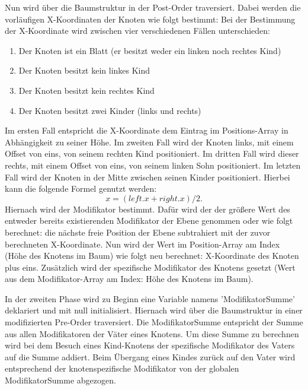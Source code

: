 Nun wird über die Baumstruktur in der Post-Order traversiert. Dabei werden die vorläufigen X-Koordinaten der Knoten wie folgt bestimmt:
Bei der Bestimmung der X-Koordinate wird zwischen vier verschiedenen Fällen unterschieden:
\begin{enumerate}
	\item Der Knoten ist ein Blatt (er besitzt weder ein linken noch rechtes Kind)
	\item Der Knoten besitzt kein linkes Kind
	\item Der Knoten besitzt kein rechtes Kind
	\item Der Knoten besitzt zwei Kinder (links und rechts)
\end{enumerate}

Im ersten Fall entspricht die X-Koordinate dem Eintrag im Positions-Array in Abhängigkeit zu seiner Höhe.
Im zweiten Fall wird der Knoten links, mit einem Offset von eins, von seinem rechten Kind positioniert.
Im dritten Fall wird dieser rechts, mit einem Offset von eins, von seinem linken Sohn positioniert. Im letzten Fall wird der Knoten
in der Mitte zwischen seinen Kinder positioniert. Hierbei kann die folgende Formel genutzt werden: $$x = (left.x + right.x) / 2.$$
Hiernach wird der Modifikator bestimmt. Dafür wird der der größere Wert des entweder bereits existierenden Modifikator der Ebene genommen
oder wie folgt berechnet: die nächste freie Position der Ebene subtrahiert mit der zuvor berechneten X-Koordinate.
Nun wird der Wert im Position-Array am Index (Höhe des Knotens im Baum) wie folgt neu berechnet:
X-Koordinate des Knoten plus eins. Zusätzlich wird der spezifische Modifikator des Knotens gesetzt
(Wert aus dem Modifikator-Array am Index: Höhe des Knotens im Baum).

In der zweiten Phase wird zu Beginn eine Variable namens 'ModifikatorSumme' deklariert und mit null initialisiert.
Hiernach wird über die Baumstruktur in einer modifizierten Pre-Order traversiert. Die ModifikatorSumme entspricht
der Summe aus allen Modifikatoren der Väter eines Knotens. Um diese Summe zu berechnen wird bei dem Besuch eines Kind-Knotens
der spezifische Modifikator des Vaters auf die Summe addiert. Beim Übergang eines Kindes zurück auf den Vater wird entsprechend
der knotenspezifische Modifikator von der globalen ModifikatorSumme abgezogen.

